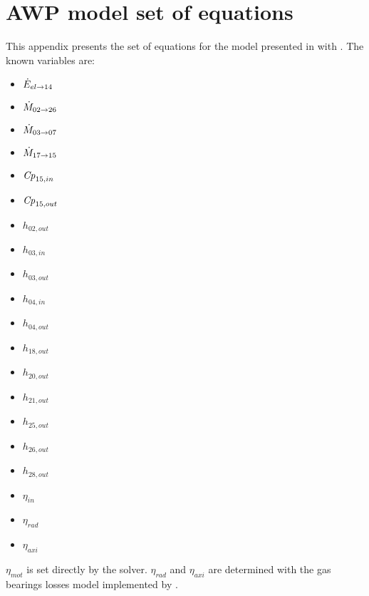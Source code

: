 \chapter{AWP model set of equations}
\label{chap:awp-eqn}
\resetallacronyms

This appendix presents the set of equations for the model presented in
 with . The
known variables are:

\begin{multicols}{5}
  \begin{itemize}
    \item $\dot{E}_{el \rightarrow 14}$
    \item $\dot{M}_{02 \rightarrow 26}$
    \item $\dot{M}_{03 \rightarrow 07}$
    \item $\dot{M}_{17 \rightarrow 15}$
    \item $\text{\textit{Cp}}_{15,in}$
    \item $\text{\textit{Cp}}_{15,out}$
    \item $h_{02,out}$
    \item $h_{03,in}$
    \item $h_{03,out}$
    \item $h_{04,in}$
    \item $h_{04,out}$
    \item $h_{18,out}$
    \item $h_{20,out}$
    \item $h_{21,out}$
    \item $h_{25,out}$
    \item $h_{26,out}$
    \item $h_{28,out}$
    \item $\eta_{in}$
    \item $\eta_{rad}$
    \item $\eta_{axi}$
  \end{itemize}
\end{multicols}

$\eta_{mot}$ is set directly by the solver. $\eta_{rad}$ and
$\eta_{axi}$ are determined with the gas bearings losses model
implemented by \citet{schiffmann-2008a}.

